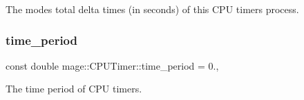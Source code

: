 The modes\textquotesingle{} total delta times (in seconds) of this C\+PU timer\textquotesingle{}s process. \hypertarget{classmage_1_1_c_p_u_timer_a9ff7683150a07f2040b660fc3775337b}{}\label{classmage_1_1_c_p_u_timer_a9ff7683150a07f2040b660fc3775337b} 
\subsubsection{\texorpdfstring{time\+\_\+period}{time\_period}}
{\footnotesize\ttfamily const double mage\+::\+C\+P\+U\+Timer\+::time\+\_\+period = 0.\hspace{0.3cm}{\ttfamily [static]}, {\ttfamily [private]}}

The time period of C\+PU timers. 